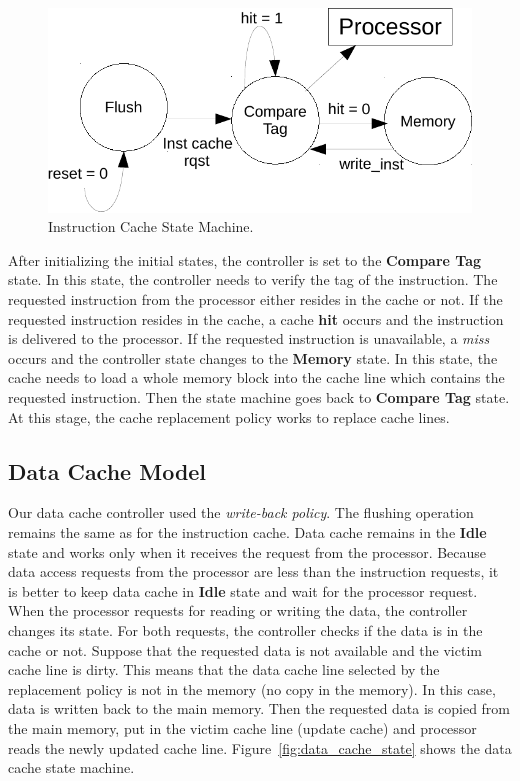\begin{figure}[tb!]
   \includegraphics[scale=1]{figures/img/inst_cache_state.pdf}
   \caption{Instruction Cache State Machine.}
\label{fig:inst_cache_state}
\end{figure}

After initializing the initial states, the controller is set to the \textbf{Compare Tag} state. In this state, the controller needs to verify the tag of the instruction. The requested instruction from the processor either resides in the cache or not. If the requested instruction resides in the cache, a cache \textbf{hit} occurs and the instruction is delivered to the processor. If the requested instruction is unavailable, a \textit{miss} occurs and the controller state changes to the \textbf{Memory} state. In this state, the cache needs to load a whole memory block into the cache line which contains the requested instruction. Then the state machine goes back to \textbf{Compare Tag} state. At this stage, the cache replacement policy works to replace cache lines.

\subsection{Data Cache Model}

Our data cache controller used the \textit{write-back policy}. The flushing operation remains the same as for the instruction cache. Data cache remains in the \textbf{Idle} state and works only when it receives the request from the processor. Because data access requests from the processor are less than the instruction requests, it is better to keep data cache in \textbf{Idle} state and wait for the processor request. When the processor requests for reading or writing the data, the controller changes its state. For both requests, the controller checks if the data is in the cache or not. Suppose that the requested data is not available and the victim cache
 line is dirty. This means that the data cache line selected by the replacement policy is not in the memory (no copy in the memory). In this case, data is written back to the main memory. Then the requested data is copied from the main memory, put in the victim cache line (update cache) and processor reads the newly updated cache line. Figure~\ref{fig:data_cache_state} shows the data cache state machine. 




